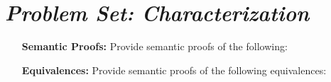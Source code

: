 \documentclass[a4paper, 11pt]{article} %
\begin{document}
\section*{\it Problem Set: Characterization}

\begin{enumerate}[leftmargin=1.2in]
	\item[\bf Semantic Proofs:] Provide semantic proofs of the following:
    \begin{enumerate}[label=\arabic*.]\small
    \end{enumerate}
	\item[\bf Equivalences:] Provide semantic proofs of the following equivalences:
    \begin{enumerate}[label=(\arabic*),resume]\small
    \end{enumerate}

\end{enumerate}
\end{document}
